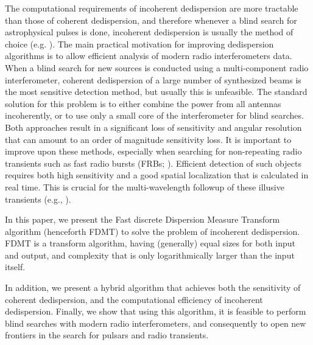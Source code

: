\documentclass[iop]{emulateapj}
\begin{document}
The computational requirements of incoherent dedispersion are more tractable than those of coherent dedispersion, and therefore whenever a blind search for astrophysical pulses is done, incoherent dedispersion is usually the method of choice (e.g. \citealp{LOFARPulsar}). 
The main practical motivation for improving dedispersion algorithms is to allow efficient analysis of modern radio interferometers data.
When a blind search for new sources is conducted using a multi-component radio interferometer, coherent dedispersion of a large number of synthesized beams is the most sensitive detection method, but usually this is unfeasible. The standard solution for this problem is to either combine the power from all antennas incoherently, or to use only a small core of the interferometer for blind searches. Both approaches result in a significant loss of sensitivity and angular resolution that can amount to an order of magnitude sensitivity loss.
It is important to improve upon these methods, especially when searching for non-repeating radio transients such as fast radio bursts (FRBs; \citealp{LorimerBurst,FRBS}). Efficient detection of such objects requires both high sensitivity and a good spatial localization that is calculated in real time. This is crucial for the multi-wavelength followup of these illusive transients (e.g., \citealp{PetroffFRBsNullDetection}).

In this paper, we present the Fast discrete Dispersion Measure Transform algorithm (henceforth FDMT) to solve the problem of incoherent dedispersion. FDMT is a transform algorithm, having (generally) equal sizes for both input and output, and complexity that is only logarithmically larger than the input itself.

In addition, we present a hybrid algorithm that achieves both the sensitivity of coherent dedispersion, and the computational efficiency of incoherent dedispersion. Finally, we show that using this algorithm, it is feasible to perform blind searches with modern radio interferometers, and consequently to open new frontiers in the search for pulsars and radio transients.
\end{document}
